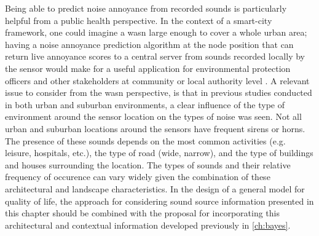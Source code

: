 Being able to predict noise annoyance from recorded sounds is particularly helpful from a public health perspective. In the context of a smart-city framework, one could imagine a \gls{wasn} large enough to cover a whole urban area; having a noise annoyance prediction algorithm at the node position that can return live annoyance scores to a central server from sounds recorded locally by the sensor would make for a useful application for environmental protection officers and other stakeholders at community or local authority level \citep{Kang2018Impact}. A relevant issue to consider from the \gls{wasn} perspective, is that in previous studies conducted in both urban \citep{Alias2020WASN} and suburban \citep{Alias2020Aggregate} environments, a clear influence of the type of environment around the sensor location on the types of noise was seen. Not all urban and suburban locations around the sensors have frequent sirens or horns. The presence of these sounds depends on the most common activities (e.g. leisure, hospitals, etc.), the type of road (wide, narrow), and the type of buildings and houses surrounding the location. The types of sounds and their relative frequency of occurence can vary widely given the combination of these architectural and landscape characteristics. In the design of a general model for quality of life, the approach for considering sound source information presented in this chapter should be combined with the proposal for incorporating this architectural and contextual information developed previously in \cref{ch:bayes}.


